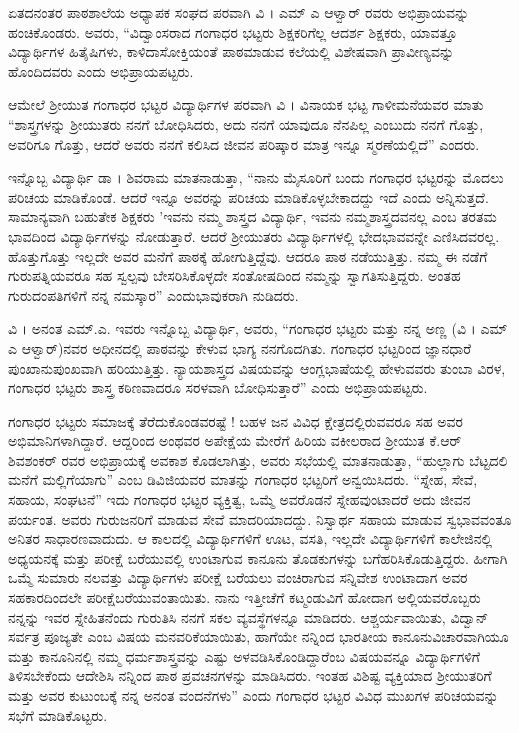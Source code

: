 {ಏತದನಂತರ ಪಾಠಶಾಲೆಯ ಅಧ್ಯಾಪಕ ಸಂಘದ ಪರವಾಗಿ ವಿ । ಎಮ್ ಎ ಆಳ್ವಾರ್ ರವರು ಅಭಿಪ್ರಾಯವನ್ನು ಹಂಚಿಕೊಂಡರು. ಅವರು, “ವಿದ್ವಾಂಸರಾದ ಗಂಗಾಧರ ಭಟ್ಟರು ಶಿಕ್ಷಕರಿಗೆಲ್ಲ ಆದರ್ಶ ಶಿಕ್ಷಕರು, ಯಾವತ್ತೂ ವಿದ್ಯಾರ್ಥಿಗಳ ಹಿತೈಷಿಗಳು, ಕಾಳಿದಾಸೋಕ್ತಿಯಂತೆ ಪಾಠಮಾಡುವ ಕಲೆಯಲ್ಲಿ ವಿಶೇಷವಾಗಿ ಪ್ರಾವೀಣ್ಯವನ್ನು ಹೊಂದಿದವರು ಎಂದು ಅಭಿಪ್ರಾಯಪಟ್ಟರು.

ಆಮೇಲೆ ಶ್ರೀಯುತ ಗಂಗಾಧರ ಭಟ್ಟರ ವಿದ್ಯಾರ್ಥಿಗಳ ಪರವಾಗಿ ವಿ । ವಿನಾಯಕ ಭಟ್ಟ ಗಾಳೀಮನೆಯವರ ಮಾತು \enginline{-} “ಶಾಸ್ತ್ರಗಳನ್ನು ಶ್ರೀಯುತರು ನನಗೆ ಬೋಧಿ\-ಸಿದರು, ಅದು ನನಗೆ ಯಾವುದೂ ನೆನಪಿಲ್ಲ ಎಂಬುದು ನನಗೆ ಗೊತ್ತು, ಅವರಿಗೂ ಗೊತ್ತು, ಆದರೆ ಅವರು ನನಗೆ ಕಲಿಸಿದ ಜೀವನ ಪರಿಷ್ಕಾರ ಮಾತ್ರ ಇನ್ನೂ ಸ್ಮರಣೆಯಲ್ಲಿದೆ” ಎಂದರು. 

ಇನ್ನೊಬ್ಬ ವಿದ್ಯಾರ್ಥಿ ಡಾ । ಶಿವರಾಮ ಮಾತನಾಡುತ್ತಾ, “ನಾನು ಮೈಸೂರಿಗೆ ಬಂದು ಗಂಗಾಧರ ಭಟ್ಟರನ್ನು ಮೊದಲು ಪರಿಚಯ ಮಾಡಿಕೊಂಡೆ. ಆದರೆ ಇನ್ನೂ ಅವರನ್ನು ಪರಿಚಯ ಮಾಡಿಕೊಳ್ಳಬೇಕಾದದ್ದು ಇದೆ ಎಂದು ಅನ್ನಿಸುತ್ತದೆ. ಸಾಮಾನ್ಯ\-ವಾಗಿ ಬಹುತೇಕ ಶಿಕ್ಷಕರು ’ಇವನು ನಮ್ಮ ಶಾಸ್ತ್ರದ ವಿದ್ಯಾರ್ಥಿ, ಇವನು ನಮ್ಮ\-ಶಾಸ್ತ್ರದವನಲ್ಲ ಎಂಬ ತರತಮ ಭಾವದಿಂದ ವಿದ್ಯಾರ್ಥಿಗಳನ್ನು ನೋಡುತ್ತಾರೆ. ಆದರೆ ಶ್ರೀಯುತರು ವಿದ್ಯಾರ್ಥಿಗಳಲ್ಲಿ ಭೇದಭಾವವನ್ನೇ ಎಣಿಸಿದವರಲ್ಲ. ಹೊತ್ತುಗೊತ್ತು ಇಲ್ಲದೇ ಅವರ ಮನೆಗೆ ಪಾಠಕ್ಕೆ ಹೋಗುತ್ತಿದ್ದೆವು. ಆದರೂ ಪಾಠ ನಡೆಯುತ್ತಿತ್ತು. ನಮ್ಮ ಈ ನಡೆಗೆ ಗುರುಪತ್ನಿಯವರೂ ಸಹ ಸ್ವಲ್ಪವು ಬೇಸರಿಸಿಕೊಳ್ಳದೇ ಸಂತೋಷದಿಂದ ನಮ್ಮನ್ನು ಸ್ವಾಗತಿಸುತ್ತಿದ್ದರು. ಅಂತಹ ಗುರುದಂಪತಿಗಳಿಗೆ ನನ್ನ ನಮಸ್ಕಾರ” ಎಂದು\break ಭಾವುಕರಾಗಿ ನುಡಿದರು.

ವಿ । ಅನಂತ ಎಮ್.ಎ. ಇವರು ಇನ್ನೊಬ್ಬ ವಿದ್ಯಾರ್ಥಿ, ಅವರು, “ಗಂಗಾಧರ ಭಟ್ಟರು ಮತ್ತು ನನ್ನ ಅಣ್ಣ (ವಿ । ಎಮ್ ಎ ಆಳ್ವಾರ್)ನವರ ಅಧೀನದಲ್ಲಿ ಪಾಠವನ್ನು ಕೇಳುವ ಭಾಗ್ಯ ನನಗೊದಗಿತು. ಗಂಗಾಧರ ಭಟ್ಟರಿಂದ ಜ್ಞಾನಧಾರೆ ಪುಂಖಾನುಪುಂಖ\-ವಾಗಿ ಹರಿಯುತ್ತಿತ್ತು. ನ್ಯಾಯಶಾಸ್ತ್ರದ ವಿಷಯವನ್ನು ಆಂಗ್ಲಭಾಷೆಯಲ್ಲಿ ಹೇಳುವವರು ತುಂಬಾ ವಿರಳ, ಗಂಗಾಧರ ಭಟ್ಟರು ಶಾಸ್ತ್ರ ಕಠಿಣವಾದರೂ ಸರಳವಾಗಿ ಬೋಧಿಸುತ್ತಾರೆ” ಎಂದು ಅಭಿಪ್ರಾಯಪಟ್ಟರು.

ಗಂಗಾಧರ ಭಟ್ಟರು ಸಮಾಜಕ್ಕೆ ತೆರೆದುಕೊಂಡವರಷ್ಟೆ ! ಬಹಳ ಜನ ವಿವಿಧ ಕ್ಷೇತ್ರ\-ದಲ್ಲಿರುವವರೂ ಸಹ ಅವರ ಅಭಿಮಾನಿಗಳಾಗಿದ್ದಾರೆ. ಆದ್ದರಿಂದ ಅಂಥವರ ಅಪೇಕ್ಷೆಯ ಮೇರೆಗೆ ಹಿರಿಯ ವಕೀಲರಾದ ಶ್ರೀಯುತ ಕೆ.ಆರ್ ಶಿವಶಂಕರ್ ರವರ ಅಭಿಪ್ರಾಯಕ್ಕೆ ಅವಕಾಶ ಕೊಡಲಾಗಿತ್ತು, ಅವರು ಸಭೆಯಲ್ಲಿ ಮಾತನಾಡುತ್ತಾ, “ಹುಲ್ಲಾಗು  ಬೆಟ್ಟದಲಿ ಮನೆಗೆ ಮಲ್ಲಿಗೆಯಾಗು” ಎಂಬ ಡಿವಿಜಿಯವರ ಮಾತನ್ನು ಗಂಗಾಧರ ಭಟ್ಟರಿಗೆ ಅನ್ವಯಿಸಿದರು. “ಸ್ನೇಹ, ಸೇವೆ, ಸಹಾಯ, ಸಂಘಟನೆ” ಇದು ಗಂಗಾಧರ ಭಟ್ಟರ ವ್ಯಕ್ತಿತ್ವ, ಒಮ್ಮೆ ಅವರೊಡನೆ ಸ್ನೇಹವುಂಟಾದರೆ ಅದು ಜೀವನ ಪರ್ಯಂತ. ಅವರು ಗುರುಜನರಿಗೆ ಮಾಡುವ ಸೇವೆ ಮಾದರಿಯಾದದ್ದು. ನಿಸ್ವಾರ್ಥ ಸಹಾಯ ಮಾಡುವ ಸ್ವಭಾವವಂತೂ ಅನಿತರ ಸಾಧಾರಣವಾದುದು. ಆ ಕಾಲದಲ್ಲಿ ವಿದ್ಯಾರ್ಥಿಗಳಿಗೆ ಊಟ, ವಸತಿ, ಇಲ್ಲದೇ ವಿದ್ಯಾರ್ಥಿಗಳಿಗೆ ಕಾಲೇಜಿನಲ್ಲಿ ಅಧ್ಯಯನಕ್ಕೆ ಮತ್ತು ಪರೀಕ್ಷೆ ಬರೆಯುವಲ್ಲಿ  ಉಂಟಾಗುವ ಕಾನೂನು ತೊಡಕುಗಳನ್ನು ಬಗೆಹರಿಸಿಕೊಡುತ್ತಿದ್ದರು. ಹೀಗಾಗಿ ಒಮ್ಮೆ ಸುಮಾರು ನಲವತ್ತು ವಿದ್ಯಾರ್ಥಿಗಳು ಪರೀಕ್ಷೆ ಬರೆಯಲು ವಂಚಿರಾಗುವ ಸನ್ನಿವೇಶ ಉಂಟಾದಾಗ ಅವರ ಸಹಕಾರದಿಂದಲೇ ಪರೀಕ್ಷೆಬರೆಯುವಂತಾಯಿತು. ನಾನು ಇತ್ತೀಚೆಗೆ ಕಟ್ಮಂಡುವಿಗೆ ಹೋದಾಗ ಅಲ್ಲಿಯವರೊಬ್ಬರು ನನ್ನನ್ನು ಇವರ ಸ್ನೇಹಿತನೆಂದು ಗುರುತಿಸಿ ನನಗೆ ಸಕಲ ವ್ಯವಸ್ಥೆಗಳನ್ನೂ ಮಾಡಿದರು. ಆಶ್ಚರ್ಯವಾಯಿತು, ವಿದ್ವಾನ್ ಸರ್ವತ್ರ ಪೂಜ್ಯತೇ ಎಂಬ ವಿಷಯ ಮನವರಿಕೆಯಾಯಿತು, ಹಾಗೆಯೇ ನನ್ನಿಂದ ಭಾರತೀಯ ಕಾನೂನು\break ವಿಚಾರವಾಗಿಯೂ ಮತ್ತು ಕಾನೂನಿನಲ್ಲಿ ನಮ್ಮ ಧರ್ಮಶಾಸ್ತ್ರವನ್ನು ಎಷ್ಟು ಅಳವಡಿಸಿಕೊಂಡಿದ್ದಾರೆಂಬ ವಿಷಯವನ್ನೂ ವಿದ್ಯಾರ್ಥಿಗಳಿಗೆ ತಿಳಿಸಬೇಕೆಂದು ಆದೇಶಿಸಿ ನನ್ನಿಂದ ಪಾಠ \enginline{-} ಪ್ರವಚನಗಳನ್ನು ಮಾಡಿಸಿದರು. ಇಂತಹ ವಿಶಿಷ್ಟ ವ್ಯಕ್ತಿಯಾದ ಶ್ರೀಯುತರಿಗೆ ಮತ್ತು ಅವರ ಕುಟುಂಬಕ್ಕೆ ನನ್ನ ಅನಂತ ವಂದನೆಗಳು” ಎಂದು ಗಂಗಾಧರ ಭಟ್ಟರ ವಿವಿಧ ಮುಖಗಳ ಪರಿಚಯವನ್ನು ಸಭೆಗೆ ಮಾಡಿಕೊಟ್ಟರು.

}

